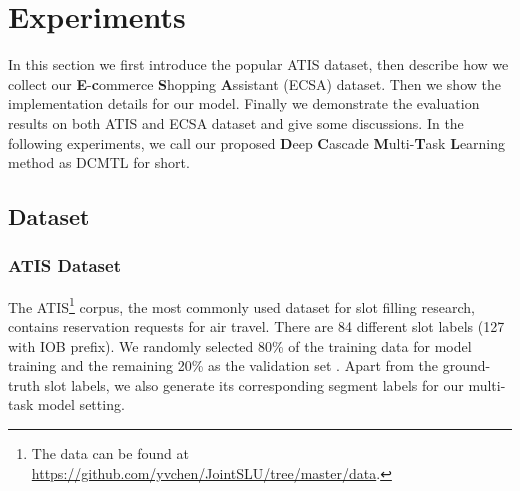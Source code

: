 \section{Experiments}
\label{sec:exp}
In this section we first introduce the popular ATIS dataset,
then describe how we collect our \textbf{E}-\textbf{c}ommerce \textbf{S}hopping \textbf{A}ssistant (ECSA) dataset.
Then we show the implementation details for our model.
Finally we demonstrate the evaluation results on both ATIS and ECSA dataset and give some discussions.
In the following experiments, we call our proposed \textbf{D}eep \textbf{C}ascade \textbf{M}ulti-\textbf{T}ask \textbf{L}earning method as DCMTL for short.

\subsection{Dataset}
\label{sec:data}
\subsubsection{ATIS Dataset}
The ATIS\footnote{The data can be found at \url{https://github.com/yvchen/JointSLU/tree/master/data}.} corpus, the most commonly used dataset for slot filling research, contains reservation requests for air travel.
There are 84 different slot labels (127 with IOB prefix). 
We randomly selected 80\% of the training data for model training and the 
remaining 20\% as the validation set \cite{mesnil2015using}.
Apart from the ground-truth slot labels, we also generate its 
corresponding segment labels for our multi-task model setting.


